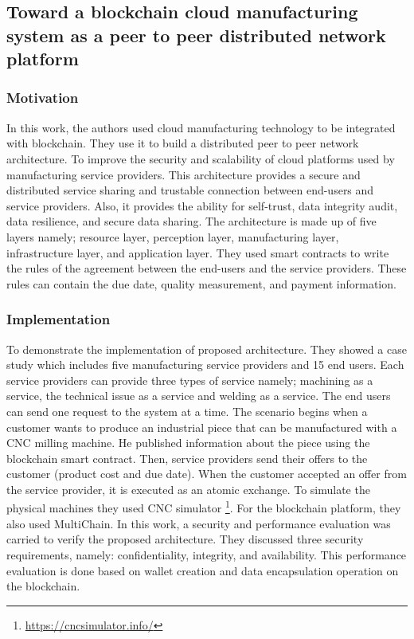 \documentclass[runningheads]{llncs}
\begin{document}
\newpage
\subsection{Toward a blockchain cloud manufacturing system as a peer to peer distributed network platform\cite{Li2018}}
\subsubsection{Motivation}
In this work, the authors used cloud manufacturing technology to be integrated with blockchain. They use it to build a distributed peer to peer network architecture. To improve the security and scalability of cloud platforms used by manufacturing service providers. This architecture provides a secure and distributed service sharing and trustable connection between end-users and service providers. Also, it provides the ability for self-trust, data integrity audit, data resilience, and secure data sharing. The architecture is made up of five layers namely; resource layer, perception layer, manufacturing layer, infrastructure layer, and application layer. They used smart contracts to write the rules of the agreement between the end-users and the service providers. These rules can contain the due date, quality measurement, and payment information.
\subsubsection{Implementation}
To demonstrate the implementation of proposed architecture. They showed a case study which includes five manufacturing service providers and 15 end users. Each service providers can provide three types of service namely; machining as a service, the technical issue as a service and welding as a service. The end users can send one request to the system at a time. The scenario begins when a customer wants to produce an industrial piece that can be manufactured with a CNC milling machine. He published information about the piece using the blockchain smart contract. Then, service providers send their offers to the customer (product cost and due date). When the customer accepted an offer from the service provider, it is executed as an atomic exchange. To simulate the physical machines they used CNC simulator \footnote{\url{https://cncsimulator.info/}}. For the blockchain platform, they also used MultiChain. In this work, a security and performance evaluation was carried to verify the proposed architecture. They discussed three security requirements, namely: confidentiality, integrity, and availability. This performance evaluation is done based on wallet creation and data encapsulation operation on the blockchain. 
\end{document}
